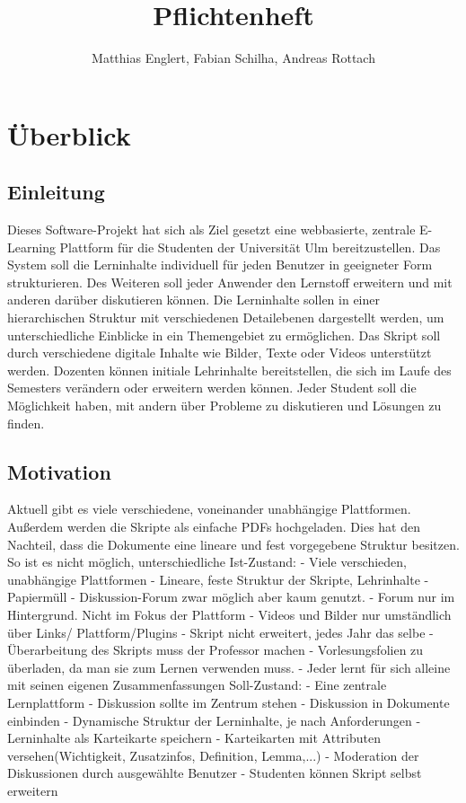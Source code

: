 \documentclass[12pt,a4paper]{book}
\author{Matthias Englert, Fabian Schilha, Andreas Rottach}
\title{Pflichtenheft}
\begin{document}
\maketitle

\tableofcontents

\chapter{Überblick}
\section{Einleitung}
Dieses Software-Projekt hat sich als Ziel gesetzt eine webbasierte, zentrale E-Learning Plattform für die Studenten der Universität Ulm bereitzustellen. Das System soll die Lerninhalte individuell für jeden Benutzer in geeigneter Form strukturieren. Des Weiteren soll jeder Anwender den Lernstoff erweitern und mit anderen darüber diskutieren können. Die Lerninhalte sollen in einer hierarchischen Struktur mit verschiedenen Detailebenen dargestellt werden, um unterschiedliche Einblicke in ein Themengebiet zu ermöglichen. Das Skript soll durch verschiedene digitale Inhalte wie Bilder, Texte oder Videos unterstützt werden. Dozenten können initiale Lehrinhalte bereitstellen, die sich im Laufe des Semesters verändern oder erweitern werden können. 
Jeder Student soll die Möglichkeit haben, mit andern über Probleme zu diskutieren und Lösungen zu finden.

\section{Motivation}
Aktuell gibt es viele verschiedene, voneinander unabhängige Plattformen. Außerdem werden die Skripte als einfache PDFs hochgeladen. Dies hat den Nachteil, dass die Dokumente eine lineare und fest vorgegebene Struktur besitzen. So ist es nicht möglich, unterschiedliche 
Ist-Zustand:
-	Viele verschieden, unabhängige Plattformen
-	Lineare, feste Struktur der Skripte, Lehrinhalte
-	Papiermüll
-	Diskussion-Forum zwar möglich aber kaum genutzt. 
-	Forum nur im Hintergrund. Nicht im Fokus der Plattform
-	Videos und Bilder nur umständlich über Links/ Plattform/Plugins
-	Skript nicht erweitert, jedes Jahr das selbe
-	Überarbeitung des Skripts muss der Professor machen
-	Vorlesungsfolien zu überladen, da man sie zum Lernen verwenden muss.
-	Jeder lernt für sich alleine mit seinen eigenen Zusammenfassungen
Soll-Zustand:
-	Eine zentrale  Lernplattform
-	Diskussion sollte im Zentrum stehen
-	Diskussion in Dokumente einbinden
-	Dynamische Struktur der Lerninhalte, je nach Anforderungen
-	Lerninhalte als Karteikarte speichern
-	Karteikarten mit Attributen versehen(Wichtigkeit, Zusatzinfos, Definition, Lemma,...)
-	Moderation der Diskussionen durch ausgewählte Benutzer
-	Studenten können Skript selbst erweitern
\end{document}
